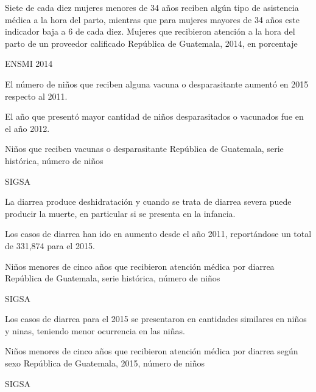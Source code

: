 %
{%
	Siete de cada diez mujeres menores de 34 años reciben algún tipo de asistencia médica a la hora del parto, mientras que para mujeres mayores de 34 años este indicador baja a 6 de cada diez. 
}%
{%
	Mujeres que recibieron atención a la hora del parto  de un proveedor calificado} %
{%
	República de Guatemala, 2014, en porcentaje} %
{%
	\begin{tikzpicture}[x=1pt,y=1pt]    \end{tikzpicture}}%
{%
	ENSMI 2014} %


%
{%
	El número de niños que reciben alguna vacuna o desparasitante aumentó en 2015 respecto al 2011. 
	
	El año que presentó mayor cantidad de niños desparasitados o vacunados fue en el año 2012.
}%
{%
	Niños que reciben vacunas o desparasitante} %
{%
	República de Guatemala, serie histórica, número de niños} %
{%
	\begin{tikzpicture}[x=1pt,y=1pt]    \end{tikzpicture}}%
{%
	SIGSA} %


%
{%
	La diarrea produce deshidratación y cuando se trata de diarrea severa puede producir la muerte, en particular si se presenta en la infancia. 
	
	Los casos de diarrea han ido en aumento desde el año 2011, reportándose un total de 331,874 para el 2015.
}%
{%
	Niños menores de cinco años que recibieron atención médica por diarrea} %
{%
	República de Guatemala, serie histórica, número de niños} %
{%
	\begin{tikzpicture}[x=1pt,y=1pt]    \end{tikzpicture}}%
{%
	SIGSA} %


%
{%
	Los casos de diarrea para el 2015 se presentaron en cantidades similares en niños y ninas, teniendo menor ocurrencia en las niñas. 
	
}%
{%
	Niños menores de cinco años que recibieron atención médica por diarrea según sexo} %
{%
	República de Guatemala, 2015, número de niños} %
{%
	\begin{tikzpicture}[x=1pt,y=1pt]    \end{tikzpicture}}%
{%
	SIGSA} %

